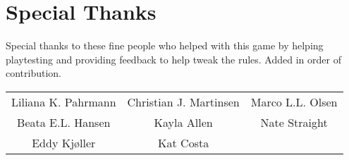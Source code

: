 \section*{Special Thanks}
Special thanks to these fine people who helped with this game by helping playtesting and providing feedback to help tweak the rules.
Added in order of contribution.
\vspace{5mm}

\noindent\begin{tabular}{ccc}
    Liliana K. Pahrmann & Christian J. Martinsen & Marco L.L. Olsen\\ 
    Beata E.L. Hansen & Kayla Allen & Nate Straight\\
    Eddy Kjøller & Kat Costa
\end{tabular}